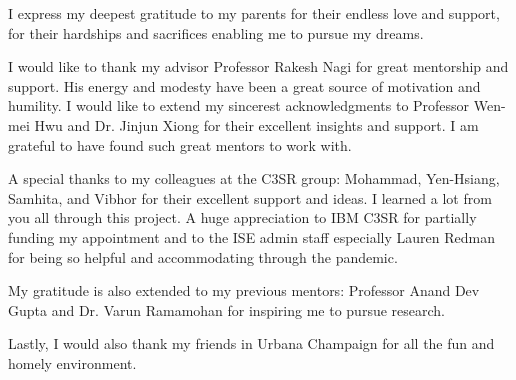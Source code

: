 I express my deepest gratitude to my parents for their endless love and support, for their hardships and sacrifices enabling me to pursue my dreams.

I would like to thank my advisor Professor Rakesh Nagi for great mentorship and support. His energy and modesty have been a great source of motivation and humility.
I would like to extend my sincerest acknowledgments to Professor Wen-mei Hwu and Dr. Jinjun Xiong for their excellent insights and support.
I am grateful to have found such great mentors to work with.

A special thanks to my colleagues at the C3SR group: Mohammad, Yen-Hsiang, Samhita, and Vibhor for their excellent support and ideas.
I learned a lot from you all through this project.
A huge appreciation to IBM C3SR for partially funding my appointment and to the ISE admin staff especially Lauren Redman for being so helpful and accommodating through the pandemic.

My gratitude is also extended to my previous mentors: Professor Anand Dev Gupta and Dr. Varun Ramamohan for inspiring me to pursue research.

Lastly, I would also thank my friends in Urbana Champaign for all the fun and homely environment.